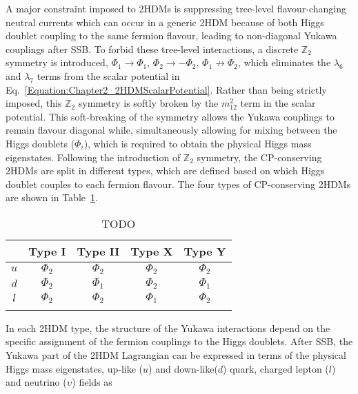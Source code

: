 A major constraint imposed to 2HDMs is suppressing tree-level flavour-changing neutral currents which can occur in a generic 2HDM because of both Higgs doublet coupling to the same fermion flavour, leading to non-diagonal Yukawa couplings after SSB. To forbid these tree-level interactions, a discrete $\mathbb{Z}_2$ symmetry \cite{2HDM(2)} is introduced, $\Phi_1 \to \Phi_1$, $\Phi_2 \to - \Phi_2$, $\Phi_1 \not\to \Phi_2$, which eliminates the $\lambda_6$ and $\lambda_7$ terms from the scalar potential in Eq.~\ref{Equation:Chapter2_2HDMScalarPotential}. Rather than being strictly imposed, this $\mathbb{Z}_2$ symmetry is softly broken by the $m_{12}^2$ term in the scalar potential. This soft-breaking of the symmetry allows the Yukawa couplings to remain flavour diagonal while, simultaneously allowing for mixing between the Higgs doublets ($\Phi_i$), which is required to obtain the physical Higgs mass eigenstates. Following the introduction of $\mathbb{Z}_2$ symmetry, the CP-conserving 2HDMs are split in different types, which are defined based on which Higgs doublet couples to each fermion flavour. The four types of CP-conserving 2HDMs are shown in Table~\ref{Table:Chapter2_2HDM-Types}.

\begin{table}[h]
\centering
\renewcommand{\arraystretch}{1.5} %
\setlength{\tabcolsep}{12pt} %
\begin{tabular}{|c|c|c|c|c|}
\hline
    & Type I   & Type II  & Type X   & Type Y   \\ \hline \hline
$u$ & $\Phi_2$ & $\Phi_2$ & $\Phi_2$ & $\Phi_2$ \\ 
\arrayrulecolor{lightgray} \hline
$d$ & $\Phi_2$ & $\Phi_1$ & $\Phi_2$ & $\Phi_1$ \\ 
\arrayrulecolor{lightgray} \hline
$l$ & $\Phi_2$ & $\Phi_2$ & $\Phi_1$ & $\Phi_2$ \\ 
\arrayrulecolor{black} \hline
\end{tabular}
\caption{TODO}
\label{Table:Chapter2_2HDM-Types}
\end{table}

In each 2HDM type, the structure of the Yukawa interactions depend on the specific assignment of the fermion couplings to the Higgs doublets. After SSB, the Yukawa part of the 2HDM Lagrangian can be expressed in terms of the physical Higgs mass eigenstates, up-like ($u$) and down-like($d$) quark, charged lepton ($l$) and neutrino ($\upsilon$) fields as

